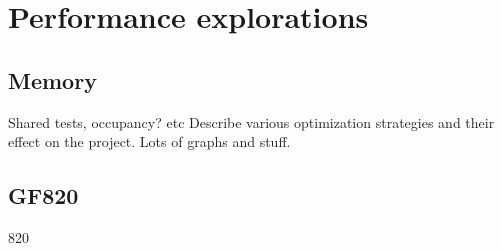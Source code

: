 \section{Performance explorations}
\subsection{Memory}
Shared tests, occupancy? etc
Describe various optimization strategies and their effect on the project. Lots of graphs and stuff.

\subsection{GF820}
820

